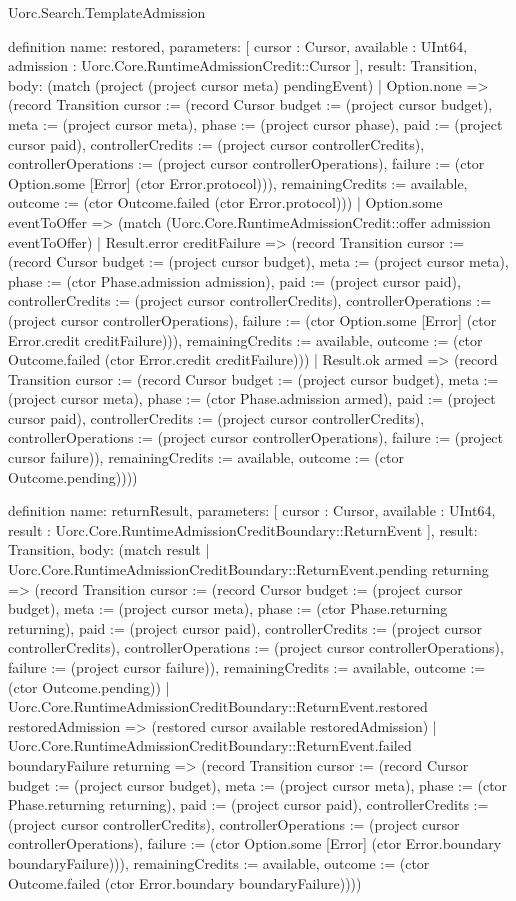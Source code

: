 \begin{lexlean}{Uorc.Search.TemplateAdmission}
\begin{semanticmodule}
definition{
  name: restored,
  parameters: [
    cursor : Cursor,
    available : UInt64,
    admission : Uorc.Core.RuntimeAdmissionCredit::Cursor
  ],
  result: Transition,
  body: (match (project (project cursor meta) pendingEvent)
    | Option.none => (record Transition {cursor := (record Cursor {budget := (project cursor budget), meta := (project cursor meta), phase := (project cursor phase), paid := (project cursor paid), controllerCredits := (project cursor controllerCredits), controllerOperations := (project cursor controllerOperations), failure := (ctor Option.some [Error] (ctor Error.protocol))}), remainingCredits := available, outcome := (ctor Outcome.failed (ctor Error.protocol))})
    | Option.some eventToOffer => (match (Uorc.Core.RuntimeAdmissionCredit::offer admission eventToOffer)
      | Result.error creditFailure => (record Transition {cursor := (record Cursor {budget := (project cursor budget), meta := (project cursor meta), phase := (ctor Phase.admission admission), paid := (project cursor paid), controllerCredits := (project cursor controllerCredits), controllerOperations := (project cursor controllerOperations), failure := (ctor Option.some [Error] (ctor Error.credit creditFailure))}), remainingCredits := available, outcome := (ctor Outcome.failed (ctor Error.credit creditFailure))})
      | Result.ok armed => (record Transition {cursor := (record Cursor {budget := (project cursor budget), meta := (project cursor meta), phase := (ctor Phase.admission armed), paid := (project cursor paid), controllerCredits := (project cursor controllerCredits), controllerOperations := (project cursor controllerOperations), failure := (project cursor failure)}), remainingCredits := available, outcome := (ctor Outcome.pending)})))
}

definition{
  name: returnResult,
  parameters: [
    cursor : Cursor,
    available : UInt64,
    result : Uorc.Core.RuntimeAdmissionCreditBoundary::ReturnEvent
  ],
  result: Transition,
  body: (match result
    | Uorc.Core.RuntimeAdmissionCreditBoundary::ReturnEvent.pending returning => (record Transition {cursor := (record Cursor {budget := (project cursor budget), meta := (project cursor meta), phase := (ctor Phase.returning returning), paid := (project cursor paid), controllerCredits := (project cursor controllerCredits), controllerOperations := (project cursor controllerOperations), failure := (project cursor failure)}), remainingCredits := available, outcome := (ctor Outcome.pending)})
    | Uorc.Core.RuntimeAdmissionCreditBoundary::ReturnEvent.restored restoredAdmission => (restored cursor available restoredAdmission)
    | Uorc.Core.RuntimeAdmissionCreditBoundary::ReturnEvent.failed boundaryFailure returning => (record Transition {cursor := (record Cursor {budget := (project cursor budget), meta := (project cursor meta), phase := (ctor Phase.returning returning), paid := (project cursor paid), controllerCredits := (project cursor controllerCredits), controllerOperations := (project cursor controllerOperations), failure := (ctor Option.some [Error] (ctor Error.boundary boundaryFailure))}), remainingCredits := available, outcome := (ctor Outcome.failed (ctor Error.boundary boundaryFailure))}))
}


\end{semanticmodule}
\end{lexlean}

